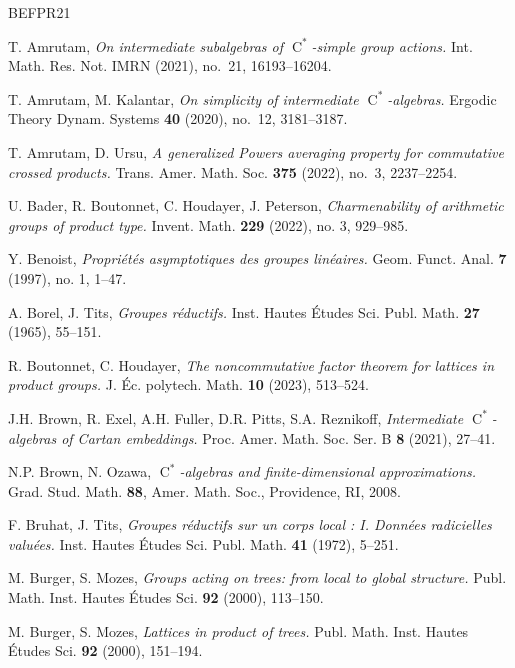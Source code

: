 \documentclass[11pt]{amsart}
\numberwithin{equation}{section}
\newcommand{\rC}{\operatorname{C}}
\theoremstyle{definition}
\begin{document}
	
	\begin{thebibliography}{BEFPR21}

		 {\sc T. Amrutam}, {\it On intermediate subalgebras of $\rC^*$-simple group actions.} Int. Math. Res. Not. IMRN (2021), no.~21, 16193--16204.

		 {\sc T. Amrutam, M. Kalantar}, {\it On simplicity of intermediate $\rC^*$-algebras.} Ergodic Theory Dynam. Systems {\bf 40} (2020), no.~12, 3181--3187.

		 {\sc T. Amrutam, D. Ursu}, {\it A generalized Powers averaging property for commutative crossed products.} Trans. Amer. Math. Soc. {\bf 375} (2022), no.~3, 2237--2254.

		 {\sc U. Bader, R. Boutonnet, C. Houdayer, J. Peterson}, {\it Charmenability of arithmetic groups of product type.} Invent. Math. {\bf 229} (2022), no. 3, 929--985.

		 {\sc Y. Benoist}, {\it Propri\'et\'es asymptotiques des groupes lin\'eaires.} Geom. Funct. Anal. {\bf 7} (1997), no. 1, 1--47.

		 {\sc A. Borel, J. Tits}, {\it Groupes r\'eductifs.} Inst. Hautes \'Etudes Sci. Publ. Math. {\bf 27} (1965), 55--151.
		
		 {\sc R. Boutonnet, C. Houdayer}, {\it The noncommutative factor theorem for lattices in product groups.} J. \'Ec. polytech. Math. {\bf 10} (2023), 513--524.
		
		 {\sc J.H. Brown, R. Exel, A.H. Fuller, D.R. Pitts, S.A. Reznikoff}, {\it Intermediate $\rC^*$-algebras of Cartan embeddings.} Proc. Amer. Math. Soc. Ser. B {\bf 8} (2021), 27--41.

		 {\sc N.P. Brown, N. Ozawa}, {\it $\rC^*$-algebras and finite-dimensional approximations.} Grad. Stud. Math. {\bf 88}, Amer. Math. Soc., Providence, RI, 2008.
		
		 {\sc F. Bruhat, J. Tits}, {\it Groupes r\'eductifs sur un corps local : I. Donn\'ees radicielles valu\'ees.} Inst. Hautes \'Etudes Sci. Publ. Math. {\bf 41} (1972), 5--251.

		 {\sc M. Burger, S. Mozes}, {\it Groups acting on trees: from local to global structure.} Publ. Math. Inst. Hautes \'Etudes Sci. {\bf 92} (2000), 113--150.

		 {\sc M. Burger, S. Mozes}, {\it Lattices in product of trees.} Publ. Math. Inst. Hautes \'Etudes Sci. {\bf 92} (2000), 151--194.


\end{thebibliography}
\end{document}
